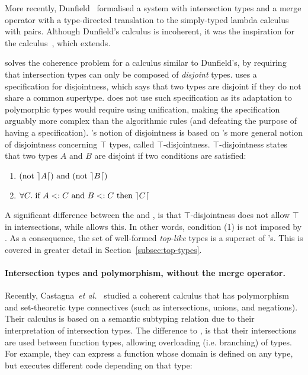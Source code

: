 More recently, Dunfield~\cite{dunfield2014elaborating} formalised a system with
intersection types and a merge operator with a type-directed translation to the
simply-typed lambda calculus with pairs. Although Dunfield's calculus
is incoherent, it was the inspiration for the
\oldname calculus~\cite{oliveira16disjoint}, which \name extends.

\oldname solves the coherence problem for a calculus similar to Dunfield's, by requiring that
intersection types can only be composed of \emph{disjoint} types.
\oldname uses a specification for disjointness, which says that two types are 
disjoint if they do not share a common supertype.
\name does not use such specification as its adaptation to polymorphic types would require
using unification, making the specification arguably more complex than
the algorithmic rules (and defeating the purpose of having a
specification). \name's notion of disjointness is based on \oldname's more
general notion of disjointness concerning $\top$ types, called
$\top$-disjointness. $\top$-disjointness 
states that two types $A$ and $B$ are disjoint if two conditions are satisfied:
\begin{enumerate}
  \item $(\text{not}~\rceil A \lceil)~\text{and}~(\text{not}~\rceil B \lceil) $
  \item $\forall C.~\text{if}~ A <: C~\text{and}~B <: C~\text{then}~\rceil C \lceil$
\end{enumerate}
\noindent A significant difference between the \name and \oldname, is that $\top$-disjointness does not allow
$\top$ in intersections, while \name allows this.
In other words, condition (1) is not imposed by \name.
As a consequence, the set of well-formed \emph{top-like} types is a superset of \oldname's.
This is covered in greater detail in Section~\ref{subsec:top-types}.

\paragraph{Intersection types and polymorphism, without the merge operator.}
Recently, Castagna~\textit{et al.}~\cite{Castagna:2014} studied a 
coherent calculus that has polymorphism and set-theoretic type connectives (such as
intersections, unions, and negations). 
Their calculus is based on a semantic subtyping relation due to their 
interpretation of intersection types.
The difference to \name, is that their intersections are used between function
types, allowing overloading (i.e. branching) of types.
For example, they can express a function whose domain is defined on any type, but executes different
code depending on that type:

